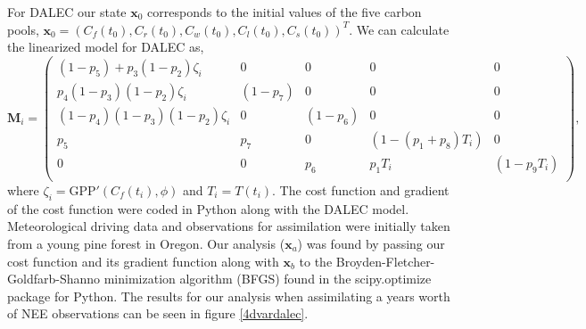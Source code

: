 \documentclass[11pt]{article}
\begin{document}
For DALEC our state $\textbf{x}_0$ corresponds to the initial values of the five carbon pools,  $\textbf{x}_0 = (C_f(t_0), C_r(t_0), C_w(t_0), C_l(t_0), C_s(t_0))^T$. We can calculate the linearized model for DALEC as,
\begin{equation}
\mathbf{M}_{i}= 
\begin{pmatrix} 
(1-p_5)+p_3(1-p_2)\zeta_i & 0 & 0 & 0 & 0 \\
p_4(1-p_3)(1-p_2)\zeta_i & (1-p_7) & 0 & 0 & 0 \\
(1-p_4)(1-p_3)(1-p_2)\zeta_i & 0 & (1-p_6) & 0 & 0 \\
p_5 & p_7 & 0 & (1-(p_1+p_8)T_i) & 0 \\
0 & 0 & p_6 & p_1T_i & (1-p_9T_i) \\
\end{pmatrix}, \label{linmod}
\end{equation}
where $\zeta_i = \text{GPP}'(C_f(t_i), \phi)$ and $T_{i}=T(t_i)$. The cost function and gradient of the cost function were coded in Python along with the DALEC model. Meteorological driving data and observations for assimilation were initially taken from a young pine forest in Oregon. Our analysis ($\textbf{x}_a$) was found by passing our cost function and its gradient function along with $\textbf{x}_b$ to the Broyden-Fletcher-Goldfarb-Shanno minimization algorithm (BFGS) \cite{Nocedal1999} found in the scipy.optimize package for Python.  The results for our analysis when assimilating a years worth of NEE observations can be seen in figure \ref{4dvardalec}.
\end{document}
